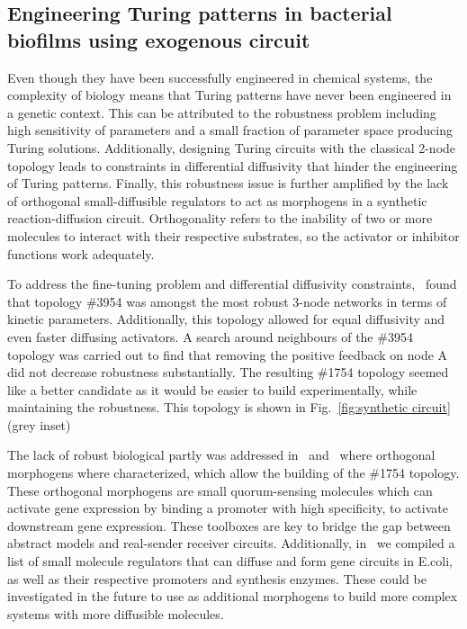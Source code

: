 \subsection{Engineering Turing patterns in bacterial biofilms using exogenous circuit }
Even though they have been successfully engineered in chemical systems, the complexity of biology means that Turing patterns have never been engineered in a genetic context.
This can be attributed to the robustness problem including high sensitivity of parameters and a small fraction of parameter space producing Turing solutions.
Additionally, designing Turing circuits with the classical 2-node topology leads to constraints in differential diffusivity that hinder the engineering of Turing patterns.
Finally, this robustness issue is further amplified by the lack of orthogonal small-diffusible regulators to act as morphogens in a synthetic reaction-diffusion circuit.
Orthogonality refers to the inability of two or more molecules to interact with their respective substrates, so the activator or inhibitor functions work adequately.
%

To address the fine-tuning problem and differential diffusivity constraints,~\cite{Scholes2019} found that topology \#3954 was amongst the most robust 3-node networks in terms of kinetic parameters. %
Additionally, this topology allowed for equal diffusivity and even faster diffusing activators.
A search around neighbours of the \#3954 topology was carried out to find that removing the positive feedback on node A did not decrease robustness substantially.
The resulting \#1754 topology seemed like a better candidate as it would be easier to build experimentally, while maintaining the robustness.
This topology is shown in Fig.~\ref{fig:synthetic circuit} (grey inset)

The lack of robust biological partly was addressed in~\cite{Meyer2019} and~\cite{Du2020} where orthogonal morphogens where characterized, which allow the building of the \#1754 topology.
These orthogonal morphogens are small quorum-sensing molecules which can activate gene expression by binding a promoter with high specificity, to activate downstream gene expression.
These toolboxes are key to bridge the gap between abstract models and real-sender receiver circuits.
Additionally, in~\cite{huidobro} we compiled a list of small molecule regulators that can diffuse and form gene circuits in E.coli, as well as their respective promoters and synthesis enzymes.
These could be investigated in the future to use as additional morphogens to build more complex systems with more diffusible molecules.

